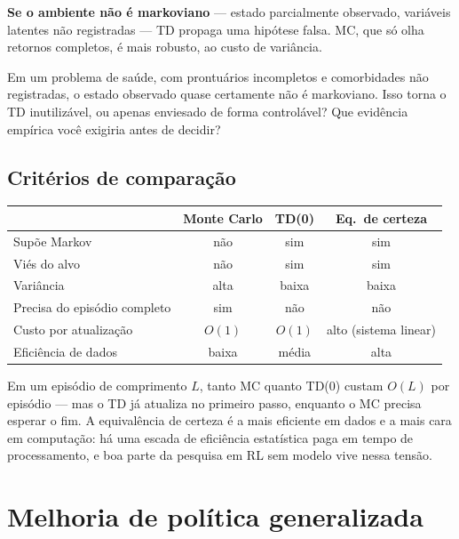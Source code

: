 \documentclass[11pt]{article}
\begin{document}
\begin{alertabox}
  \textbf{Se o ambiente não é markoviano} --- estado parcialmente observado,
  variáveis latentes não registradas --- TD propaga uma hipótese falsa. MC, que
  só olha retornos completos, é mais robusto, ao custo de variância.
\end{alertabox}

\begin{discbox}
  Em um problema de saúde, com prontuários incompletos e comorbidades não
  registradas, o estado observado quase certamente não é markoviano. Isso torna
  o TD inutilizável, ou apenas enviesado de forma controlável? Que evidência
  empírica você exigiria antes de decidir?
\end{discbox}

\subsection{Critérios de comparação}

\begin{center}\small
\begin{tabular}{lccc}
  \toprule
  & \textbf{Monte Carlo} & \textbf{TD(0)} & \textbf{Eq.\ de certeza} \\
  \midrule
  Supõe Markov              & não     & sim     & sim \\
  Viés do alvo              & não     & sim     & sim \\
  Variância                 & alta    & baixa   & baixa \\
  Precisa do episódio completo & sim  & não     & não \\
  Custo por atualização     & $O(1)$  & $O(1)$  & alto (sistema linear) \\
  Eficiência de dados       & baixa   & média   & alta \\
  \bottomrule
\end{tabular}
\end{center}

Em um episódio de comprimento $L$, tanto MC quanto TD(0) custam $O(L)$ por
episódio --- mas o TD já atualiza no primeiro passo, enquanto o MC precisa
esperar o fim. A equivalência de certeza é a mais eficiente em dados e a mais
cara em computação: há uma escada de eficiência estatística paga em tempo de
processamento, e boa parte da pesquisa em RL sem modelo vive nessa tensão.

\section{Melhoria de política generalizada}
\end{document}
